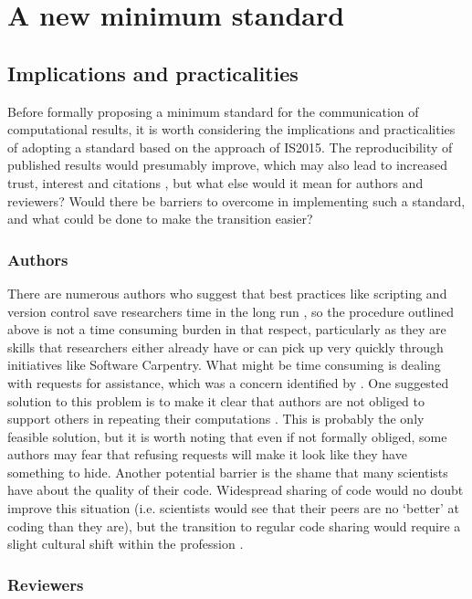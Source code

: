 \section{A new minimum standard}

\subsection{Implications and practicalities}

Before formally proposing a minimum standard for the communication of computational results, it is worth considering the implications and practicalities of adopting a standard based on the approach of IS2015. The reproducibility of published results would presumably improve, which may also lead to increased trust, interest and citations \citep{Piwowar2007}, but what else would it mean for authors and reviewers? Would there be barriers to overcome in implementing such a standard, and what could be done to make the transition easier?

\subsubsection{Authors}

There are numerous authors who suggest that best practices like scripting and version control save researchers time in the long run \citep[e.g.][]{Sandve2013,Wilson2014a}, so the procedure outlined above is not a time consuming burden in that respect, particularly as they are skills that researchers either already have or can pick up very quickly through initiatives like Software Carpentry. What might be time consuming is dealing with requests for assistance, which was a concern identified by \citet{Stodden2010}. One suggested solution to this problem is to make it clear that authors are not obliged to support others in repeating their computations \citep{Easterbrook2014}. This is probably the only feasible solution, but it is worth noting that even if not formally obliged, some authors may fear that refusing requests will make it look like they have something to hide. Another potential barrier is the shame that many scientists have about the quality of their code. Widespread sharing of code would no doubt improve this situation (i.e. scientists would see that their peers are no `better' at coding than they are), but the transition to regular code sharing would require a slight cultural shift within the profession \citep{Barnes2010}.

\subsubsection{Reviewers}

